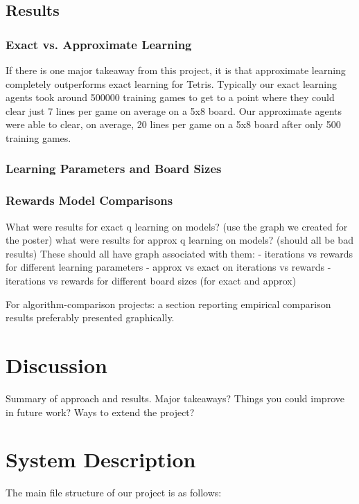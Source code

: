 \documentclass[11pt]{article}
\begin{document}
\subsection{Results}

\subsubsection{Exact vs. Approximate Learning}
If there is one major takeaway from this project, it is that approximate learning completely outperforms exact learning for Tetris. Typically our exact learning agents took around 500000 training games to get to a point where they could clear just 7 lines per game on average on a 5x8 board. Our approximate agents were able to clear, on average, 20 lines per game on a 5x8 board after only 500 training games.

\subsubsection{Learning Parameters and Board Sizes}


\subsubsection{Rewards Model Comparisons}
What were results for exact q learning on models? (use the graph we created for the poster)
what were results for approx q learning on models? (should all be bad results)
These should all have graph associated with them:
- iterations vs rewards for different learning parameters
- approx vs exact on iterations vs rewards
- iterations vs rewards for different board sizes (for exact and approx)

For algorithm-comparison projects: a section reporting empirical comparison results preferably presented graphically.


\section{Discussion}

Summary of approach and results. Major takeaways? Things you could improve in future work? Ways to extend the project?

\appendix

\section{System Description}
The main file structure of our project is as follows:
\end{document}
